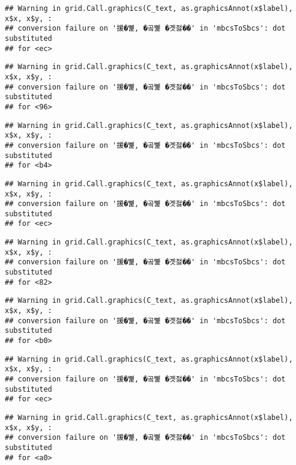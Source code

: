 \documentclass[
]{article}
\begin{document}
\begin{verbatim}
## Warning in grid.Call.graphics(C_text, as.graphicsAnnot(x$label), x$x, x$y, :
## conversion failure on '援�뼱, �곸뼱 �곗젏��' in 'mbcsToSbcs': dot substituted
## for <ec>
\end{verbatim}

\begin{verbatim}
## Warning in grid.Call.graphics(C_text, as.graphicsAnnot(x$label), x$x, x$y, :
## conversion failure on '援�뼱, �곸뼱 �곗젏��' in 'mbcsToSbcs': dot substituted
## for <96>
\end{verbatim}

\begin{verbatim}
## Warning in grid.Call.graphics(C_text, as.graphicsAnnot(x$label), x$x, x$y, :
## conversion failure on '援�뼱, �곸뼱 �곗젏��' in 'mbcsToSbcs': dot substituted
## for <b4>
\end{verbatim}

\begin{verbatim}
## Warning in grid.Call.graphics(C_text, as.graphicsAnnot(x$label), x$x, x$y, :
## conversion failure on '援�뼱, �곸뼱 �곗젏��' in 'mbcsToSbcs': dot substituted
## for <ec>
\end{verbatim}

\begin{verbatim}
## Warning in grid.Call.graphics(C_text, as.graphicsAnnot(x$label), x$x, x$y, :
## conversion failure on '援�뼱, �곸뼱 �곗젏��' in 'mbcsToSbcs': dot substituted
## for <82>
\end{verbatim}

\begin{verbatim}
## Warning in grid.Call.graphics(C_text, as.graphicsAnnot(x$label), x$x, x$y, :
## conversion failure on '援�뼱, �곸뼱 �곗젏��' in 'mbcsToSbcs': dot substituted
## for <b0>
\end{verbatim}

\begin{verbatim}
## Warning in grid.Call.graphics(C_text, as.graphicsAnnot(x$label), x$x, x$y, :
## conversion failure on '援�뼱, �곸뼱 �곗젏��' in 'mbcsToSbcs': dot substituted
## for <ec>
\end{verbatim}

\begin{verbatim}
## Warning in grid.Call.graphics(C_text, as.graphicsAnnot(x$label), x$x, x$y, :
## conversion failure on '援�뼱, �곸뼱 �곗젏��' in 'mbcsToSbcs': dot substituted
## for <a0>
\end{verbatim}
\end{document}
